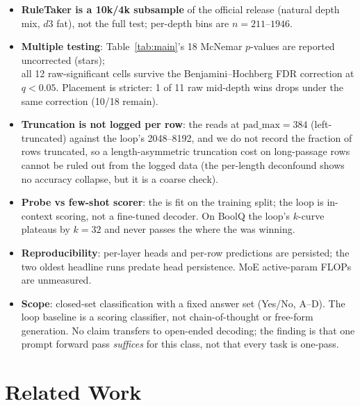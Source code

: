 \begin{itemize}
\item \textbf{RuleTaker is a 10k/4k subsample} of the official release
  (natural depth mix, $d3$ fat), not the full test; per-depth bins are
  $n{=}211$--$1946$.
\item \textbf{Multiple testing}: Table~\ref{tab:main}'s 18 McNemar $p$-values
  are reported uncorrected (stars);\\
  all 12 raw-significant cells survive the
  Benjamini--Hochberg FDR correction at $q{<}0.05$. Placement is stricter: 1
  of 11 raw mid-depth wins drops under the same correction (10/18 remain).
\item \textbf{Truncation is not logged per row}: the \head{} reads at
  $\mathrm{pad\_max}=384$ (left-truncated) against the loop's 2048--8192, and
  we do not record the fraction of rows truncated, so a length-asymmetric
  truncation cost on long-passage rows cannot be ruled out from the logged
  data (the per-length deconfound shows no accuracy collapse, but it is a
  coarse check).
\item \textbf{Probe vs few-shot scorer}: the \head{} is fit on the training
  split; the loop is in-context scoring, not a fine-tuned decoder. On BoolQ
  the loop's $k$-curve plateaus by $k{=}32$ and never passes the \head{}
  where the \head{} was winning.
\item \textbf{Reproducibility}: per-layer heads and per-row predictions are
  persisted; the two oldest headline runs predate
  head persistence. MoE active-param FLOPs are unmeasured.
\item \textbf{Scope}: closed-set classification with a fixed answer set
  (Yes/No, A--D). The loop baseline is a scoring classifier, not
  chain-of-thought or free-form generation. No claim transfers to open-ended
  decoding; the finding is that one prompt forward pass \emph{suffices} for
  this class, not that every task is one-pass.
\end{itemize}

\section{Related Work}
\label{sec:related}

